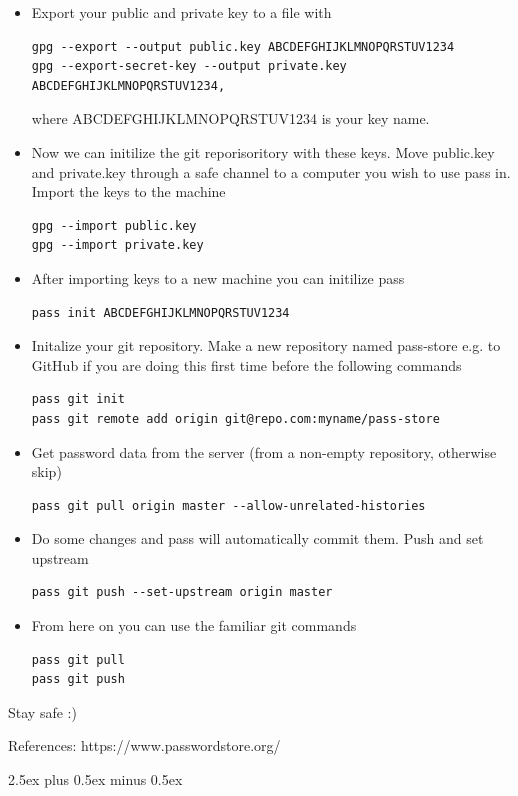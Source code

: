 \documentclass{article}
\begin{document}
\begin{itemize}
\item Export your public and private key to a file with \\
  \begin{verbatim}
gpg --export --output public.key ABCDEFGHIJKLMNOPQRSTUV1234 
gpg --export-secret-key --output private.key ABCDEFGHIJKLMNOPQRSTUV1234,
  \end{verbatim}
  where ABCDEFGHIJKLMNOPQRSTUV1234 is your key name.\\
\item Now we can initilize the git reporisoritory with these keys. Move public.key and private.key through a safe channel to a computer you wish to use pass in. Import the keys to the machine \\
\begin{verbatim}
gpg --import public.key
gpg --import private.key
\end{verbatim}
\item After importing keys to a new machine you can initilize pass
\begin{verbatim}
pass init ABCDEFGHIJKLMNOPQRSTUV1234
\end{verbatim}

\item Initalize your git repository. Make a new repository named pass-store e.g. to GitHub if you are doing this first time before the following commands\\
\begin{verbatim}
pass git init 
pass git remote add origin git@repo.com:myname/pass-store
 \end{verbatim}
\item Get password data from the server (from a non-empty repository, otherwise skip)
\begin{verbatim}
pass git pull origin master --allow-unrelated-histories
\end{verbatim}
\item Do some changes and pass will automatically commit them. Push and set upstream \\
\begin{verbatim}
pass git push --set-upstream origin master 
\end{verbatim}
\item From here on you can use the familiar git commands \\
\begin{verbatim}
pass git pull 
pass git push 
\end{verbatim}
\end{itemize}
Stay safe :)

\vspace{2cm}
References:
    https://www.passwordstore.org/



%
%
\parindent0pt
\parskip2.5ex plus 0.5ex minus 0.5ex
\end{document}
